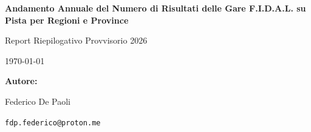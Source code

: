 \documentclass[a4paper, landscape]{article}
\begin{document}
\begin{titlepage}
    \thispagestyle{fancy} %
    \centering
    \vspace*{3cm}
    {\Huge\bfseries Andamento Annuale del Numero di Risultati delle Gare F.I.D.A.L. su Pista per Regioni e Province\par}
    \vspace{1cm}
    {\Large Report Riepilogativo Provvisorio 2026\par}
    \vspace{0.5cm}
    {\large \today\par}
    \vspace{2cm}
    {\large\textbf{Autore:}\par}
    Federico De Paoli
    \par\vspace{0.3cm}
    {\normalsize\texttt{fdp.federico@proton.me}\par}
\end{titlepage}

\clearpage
\thispagestyle{fancy}
\begin{center}
    \begin{minipage}{0.6\textwidth}
        \begin{abstract}
            Le seguenti pagine riportano il numero totale dei risultati delle 
            gare su pista (indoor e outdoor) conseguiti di anno in anno (dal
            2005 a oggi) dagli atleti, raggruppati nella rispettiva regione e
            provincia della società di appartenenza.
            È possibile vedere e quantificare l'effetto del covid negli anni 2020 e 2021,
            e il nuovo calo di atleti degli ultimi anni, suddiviso per categorie.
            I dati sono stati presi dalle graduatorie F.I.D.A.L. 
            (\url{https://www.fidal.it/graduatorie.php}) e sono aggiornati al 08-09-2026.
            Viene fornita anche una predizione sul numero di risultati che saranno 
            registrati a stagione 2026 conclusa da ogni provincia e regione per
            ogni categoria.

            ~

            \textit{Questo documento è un'iniziativa personale e indipendente, non 
            ufficiale né avallata da F.I.D.A.L. I dati sono aggregati 
            statisticamente (nessun dato nominativo individuale è riportato) e 
            le previsioni di fine stagione sono soggette a possibili imprecisioni.}
        \end{abstract}
    \end{minipage}
\end{center}
\end{document}
